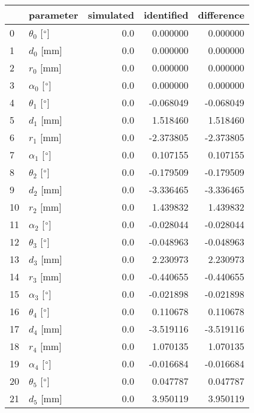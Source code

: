 \documentclass{standalone}%
\begin{document}
%
\normalsize%
\begin{tabular}{llrrr}
\toprule
{} &                 parameter & simulated & identified & difference \\
\midrule
0  &  $\theta_{0}$ [$\degree$] &       0.0 &   0.000000 &   0.000000 \\
1  &              $d_{0}$ [mm] &       0.0 &   0.000000 &   0.000000 \\
2  &              $r_{0}$ [mm] &       0.0 &   0.000000 &   0.000000 \\
3  &  $\alpha_{0}$ [$\degree$] &       0.0 &   0.000000 &   0.000000 \\
4  &  $\theta_{1}$ [$\degree$] &       0.0 &  -0.068049 &  -0.068049 \\
5  &              $d_{1}$ [mm] &       0.0 &   1.518460 &   1.518460 \\
6  &              $r_{1}$ [mm] &       0.0 &  -2.373805 &  -2.373805 \\
7  &  $\alpha_{1}$ [$\degree$] &       0.0 &   0.107155 &   0.107155 \\
8  &  $\theta_{2}$ [$\degree$] &       0.0 &  -0.179509 &  -0.179509 \\
9  &              $d_{2}$ [mm] &       0.0 &  -3.336465 &  -3.336465 \\
10 &              $r_{2}$ [mm] &       0.0 &   1.439832 &   1.439832 \\
11 &  $\alpha_{2}$ [$\degree$] &       0.0 &  -0.028044 &  -0.028044 \\
12 &  $\theta_{3}$ [$\degree$] &       0.0 &  -0.048963 &  -0.048963 \\
13 &              $d_{3}$ [mm] &       0.0 &   2.230973 &   2.230973 \\
14 &              $r_{3}$ [mm] &       0.0 &  -0.440655 &  -0.440655 \\
15 &  $\alpha_{3}$ [$\degree$] &       0.0 &  -0.021898 &  -0.021898 \\
16 &  $\theta_{4}$ [$\degree$] &       0.0 &   0.110678 &   0.110678 \\
17 &              $d_{4}$ [mm] &       0.0 &  -3.519116 &  -3.519116 \\
18 &              $r_{4}$ [mm] &       0.0 &   1.070135 &   1.070135 \\
19 &  $\alpha_{4}$ [$\degree$] &       0.0 &  -0.016684 &  -0.016684 \\
20 &  $\theta_{5}$ [$\degree$] &       0.0 &   0.047787 &   0.047787 \\
21 &              $d_{5}$ [mm] &       0.0 &   3.950119 &   3.950119 \\

\end{tabular}
\end{document}
